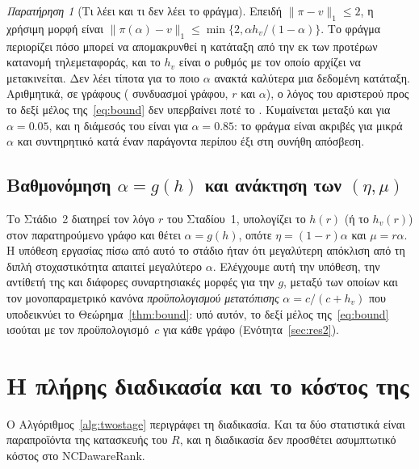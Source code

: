 \documentclass[11pt,a4paper]{article}
\theoremstyle{definition}
\theoremstyle{remark}
\newtheorem{remark}{Παρατήρηση}
\begin{document}
\begin{remark}[Τι λέει και τι δεν λέει το φράγμα]\label{rem:bound}
Επειδή $\|\pi-v\|_1\le2$, η χρήσιμη μορφή είναι
$\|\pi(\alpha)-v\|_1\le\min\{2,\alpha h_v/(1-\alpha)\}$. Το φράγμα περιορίζει πόσο μπορεί να
απομακρυνθεί η κατάταξη από την εκ των προτέρων κατανομή τηλεμεταφοράς, και το $h_v$ είναι ο ρυθμός με
τον οποίο αρχίζει να μετακινείται. Δεν λέει τίποτα για το ποιο $\alpha$ ανακτά καλύτερα μια δεδομένη
κατάταξη. Αριθμητικά, σε \BoundGraphs{} γράφους (\BoundCases{} συνδυασμοί γράφου, $r$ και $\alpha$), ο
λόγος του αριστερού προς το δεξί μέλος της~\eqref{eq:bound} δεν υπερβαίνει ποτέ το \BoundMax.
Κυμαίνεται μεταξύ \BoundLoMin{} και \BoundLoMax{} για $\alpha=0.05$, και η διάμεσός του είναι
\BoundMedEightyFive{} για $\alpha=0.85$: το φράγμα είναι ακριβές για μικρά $\alpha$ και συντηρητικό κατά
έναν παράγοντα περίπου έξι στη συνήθη απόσβεση.
\end{remark}

\subsection{Βαθμονόμηση \texorpdfstring{$\alpha=g(h)$}{α = g(h)} και ανάκτηση των \texorpdfstring{$(\eta,\mu)$}{(η, μ)}}
Το Στάδιο~2 διατηρεί τον λόγο $r$ του Σταδίου~1, υπολογίζει το $h(r)$ (ή το $h_v(r)$) στον
παρατηρούμενο γράφο και θέτει $\alpha=g(h)$, οπότε $\eta=(1-r)\alpha$ και $\mu=r\alpha$. Η υπόθεση
εργασίας πίσω από αυτό το στάδιο ήταν ότι μεγαλύτερη απόκλιση από τη διπλή στοχαστικότητα απαιτεί
μεγαλύτερο $\alpha$. Ελέγχουμε αυτή την υπόθεση, την αντίθετή της και διάφορες συναρτησιακές μορφές
για την $g$, μεταξύ των οποίων και τον μονοπαραμετρικό κανόνα \emph{προϋπολογισμού μετατόπισης}
$\alpha=c/(c+h_v)$ που υποδεικνύει το Θεώρημα~\ref{thm:bound}: υπό αυτόν, το δεξί μέλος
της~\eqref{eq:bound} ισούται με τον προϋπολογισμό~$c$ για κάθε γράφο (Ενότητα~\ref{sec:res2}).

\section{Η πλήρης διαδικασία και το κόστος της}
\label{sec:proc}

Ο Αλγόριθμος~\ref{alg:twostage} περιγράφει τη διαδικασία. Και τα δύο στατιστικά είναι παραπροϊόντα της
κατασκευής του $R$, και η διαδικασία δεν προσθέτει ασυμπτωτικό κόστος στο NCDawareRank.
\end{document}
